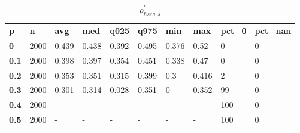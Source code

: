 \begin{table}[h]
 \centering 
\footnotesize
\caption{$\rho_{hscg,s}^\prime $}
\label{tab:alphahscgs}
\begin{tabular}[h]{| l l l l l l l l l l|
    } \hline
\textbf{ p} & \textbf{ n} & \textbf{ avg} & \textbf{ med} & \textbf{ q025} & \textbf{ q975} & \textbf{ min} & \textbf{ max} & \textbf{ pct\_0} & \textbf{ pct\_nan}
           \\
  \textbf{  0} & 2000 & 0.439 & 0.438 & 0.392 & 0.495 & 0.376 &  0.52 &   0 & 0
           \\
  \textbf{0.1} & 2000 & 0.398 & 0.397 & 0.354 & 0.451 & 0.338 &  0.47 &   0 & 0
           \\
  \textbf{0.2} & 2000 & 0.353 & 0.351 & 0.315 & 0.399 &   0.3 & 0.416 &   2 & 0
           \\
  \textbf{0.3} & 2000 & 0.301 & 0.314 & 0.028 & 0.351 &     0 & 0.352 &  99 & 0
           \\
  \textbf{0.4} & 2000 & - & - & - & - & - & - & 100 & 0
           \\
  \textbf{0.5} & 2000 & - & - & - & - & - & - & 100 & 0
           \\
 \hline \end{tabular}
 \end{table}
